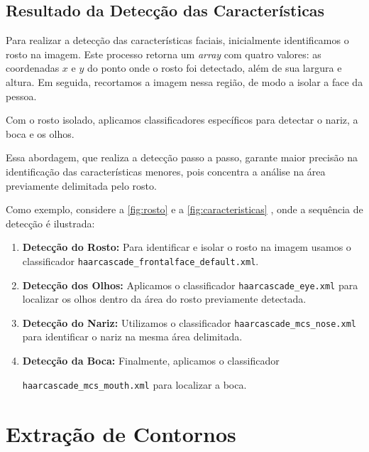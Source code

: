\subsection{Resultado da Detecção das Características}

Para realizar a detecção das características faciais, inicialmente identificamos o rosto na imagem. Este processo retorna um \textit{array} com quatro valores: as coordenadas $x$ e $y$ do ponto onde o rosto foi detectado, além de sua largura e altura. Em seguida, recortamos a imagem nessa região, de modo a isolar a face da pessoa.

Com o rosto isolado, aplicamos classificadores específicos para detectar o nariz, a boca e os olhos.

Essa abordagem, que realiza a detecção passo a passo, garante maior precisão na identificação das características menores, pois concentra a análise na área previamente delimitada pelo rosto.

Como exemplo, considere a \autoref{fig:rosto} e a \autoref{fig:caracteristicas} , onde a sequência de detecção é ilustrada:

\begin{enumerate}
\item \textbf{Detecção do Rosto:} Para identificar e isolar o rosto na imagem usamos o classificador \texttt{haarcascade\_frontalface\_default.xml}.
\item \textbf{Detecção dos Olhos:} Aplicamos o classificador \texttt{haarcascade\_eye.xml} para localizar os olhos dentro da área do rosto previamente detectada.
\item \textbf{Detecção do Nariz:} Utilizamos o classificador \texttt{haarcascade\_mcs\_nose.xml} para identificar o nariz na mesma área delimitada.
\item \textbf{Detecção da Boca:} Finalmente, aplicamos o classificador 

\texttt{haarcascade\_mcs\_mouth.xml} para localizar a boca.
\end{enumerate}




\section{Extração de Contornos}

